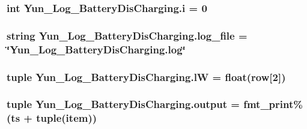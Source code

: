 \hypertarget{namespaceYun__Log__BatteryDisCharging_a654150a60ddad75d24477880074dc41b}{
\subsubsection[{i}]{\setlength{\rightskip}{0pt plus 5cm}int Yun\-\_\-\-Log\-\_\-\-Battery\-Dis\-Charging.\-i = 0}}\label{namespaceYun__Log__BatteryDisCharging_a654150a60ddad75d24477880074dc41b}
\hypertarget{namespaceYun__Log__BatteryDisCharging_ae9fb446099ac1137500398f8012e4c78}{
\subsubsection[{log\-\_\-file}]{\setlength{\rightskip}{0pt plus 5cm}string Yun\-\_\-\-Log\-\_\-\-Battery\-Dis\-Charging.\-log\-\_\-file = \char`\"{}Yun\-\_\-\-Log\-\_\-\-Battery\-Dis\-Charging.\-log\char`\"{}}}\label{namespaceYun__Log__BatteryDisCharging_ae9fb446099ac1137500398f8012e4c78}
\hypertarget{namespaceYun__Log__BatteryDisCharging_afe66ed561e996e3621e1c0bccd34db56}{
\subsubsection[{l\-W}]{\setlength{\rightskip}{0pt plus 5cm}tuple Yun\-\_\-\-Log\-\_\-\-Battery\-Dis\-Charging.\-l\-W = float(row\mbox{[}2\mbox{]})}}\label{namespaceYun__Log__BatteryDisCharging_afe66ed561e996e3621e1c0bccd34db56}
\hypertarget{namespaceYun__Log__BatteryDisCharging_a8b945e1cfc118372730aa3ab025d90c5}{
\subsubsection[{output}]{\setlength{\rightskip}{0pt plus 5cm}tuple Yun\-\_\-\-Log\-\_\-\-Battery\-Dis\-Charging.\-output = {\bf fmt\-\_\-print}\%({\bf ts} + tuple(item))}}\label{namespaceYun__Log__BatteryDisCharging_a8b945e1cfc118372730aa3ab025d90c5}
